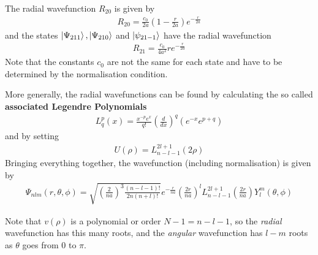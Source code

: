 The radial wavefunction $R_{20}$ is given by
\begin{align*}
	R_{20} = \frac{c_0}{2a}(1 - \frac{r}{2a}) e^{-\frac{r}{2a}}
\end{align*}
and the states $\ket{\Psi_{211}}, \ket{\Psi_{210}}$ and $\ket{\psi_{21-1}}$ have the radial wavefunction
\begin{align*}
	R_{21} = \frac{c_0}{4a^2}re^{-\frac{r}{2a}}
\end{align*}
Note that the constants $c_0$ are not the same for each state and have to be determined by the normalisation condition.

More generally, the radial wavefunctions can be found by calculating the so called \textbf{associated Legendre Polynomials}
\begin{align*}
	L_q^{p}(x) = \frac{x^{-p}e^{x}}{q!}
	\left( \frac{d}{dx}	\right)^{q} (e^{-x}e^{p+q})
\end{align*}
and by setting
\begin{align*}
	U(\rho) = L_{n-l-1}^{2l +1} (2 \rho)
\end{align*}
Bringing everything together, the wavefunction (including normalisation) is given by
\begin{align*}
	\Psi_{nlm}(r,\theta,\phi) 
	=
	\sqrt{\left(
		\frac{2}{n a}
	\right)^{3}
	\frac{(n-l-1)!}{2n(n+l)!}
}
e^{-\frac{r}{na}}
\left(
	\frac{2r}{na}
\right)^{l}
L_{n-l-1}^{2l + 1} \left(
	\frac{2r}{na}
\right)
Y_{l}^{m}(\theta,\phi)
\end{align*}

Note that $v(\rho)$ is a polynomial or order $N-1 = n -l - 1$, so the \emph{radial} wavefunction has this many roots, and the \emph{angular} wavefunction has $l-m$ roots as $\theta$ goes from $0$ to $\pi$.

